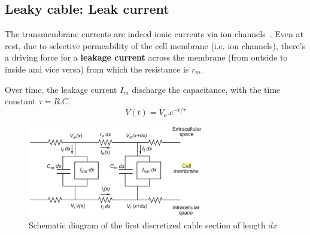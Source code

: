 \subsection{Leaky cable: Leak current}

The transmembrane currents are indeed ionic currents via ion
channels~\citep{keener1998mp}. Even at rest, due to selective permeability of
the cell membrane (i.e. ion channels), there's a driving force for a {\bf
leakage current} across the membrane (from outside to inside and vice versa)
from which the resistance is $r_m$.

Over time, the leakage current $I_m$ discharge the capacitance, with the time
constant $\tau=R.C$.
\begin{equation}
V(t) = V_o . e^{-t/\tau}
\end{equation}
 
\begin{figure}[hbt]
  \centerline{\includegraphics[height=4cm,
    angle=0]{./images/cable_circuit.eps}}
  \caption{Schematic diagram of the first discretized cable section of
    length $dx$}
\label{fig:cable_circuit}
\end{figure}
% 
% 
% 


